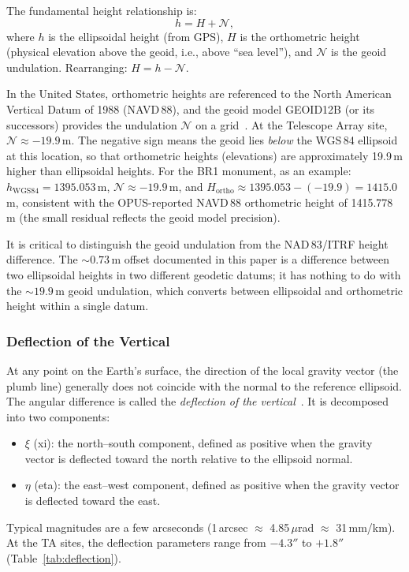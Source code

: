 The fundamental height relationship is:
\begin{equation}
h = H + \mathcal{N},
\label{eq:height_relation}
\end{equation}
where $h$ is the ellipsoidal height (from GPS), $H$ is the orthometric height (physical elevation above the geoid, i.e., above ``sea level''), and $\mathcal{N}$ is the geoid undulation. Rearranging: $H = h - \mathcal{N}$.

In the United States, orthometric heights are referenced to the North American Vertical Datum of 1988 (NAVD\,88), and the geoid model GEOID12B (or its successors) provides the undulation $\mathcal{N}$ on a grid~\cite{roman2012}. At the Telescope Array site, $\mathcal{N} \approx -19.9$\,m. The negative sign means the geoid lies \emph{below} the WGS\,84 ellipsoid at this location, so that orthometric heights (elevations) are approximately 19.9\,m higher than ellipsoidal heights. For the BR1 monument, as an example: $h_{\text{WGS84}} = 1395.053$\,m, $\mathcal{N} \approx -19.9$\,m, and $H_{\text{ortho}} \approx 1395.053 - (-19.9) = 1415.0$\,m, consistent with the OPUS-reported NAVD\,88 orthometric height of 1415.778\,m (the small residual reflects the geoid model precision).

It is critical to distinguish the geoid undulation from the NAD\,83/ITRF height difference. The $\sim\!0.73$\,m offset documented in this paper is a difference between two ellipsoidal heights in two different geodetic datums; it has nothing to do with the $\sim\!19.9$\,m geoid undulation, which converts between ellipsoidal and orthometric height within a single datum.

\subsubsection{Deflection of the Vertical}
\label{sec:deflection}

At any point on the Earth's surface, the direction of the local gravity vector (the plumb line) generally does not coincide with the normal to the reference ellipsoid. The angular difference is called the \emph{deflection of the vertical}~\cite{torge2012}. It is decomposed into two components:
\begin{itemize}[nosep]
\item $\xi$ (xi): the north--south component, defined as positive when the gravity vector is deflected toward the north relative to the ellipsoid normal.
\item $\eta$ (eta): the east--west component, defined as positive when the gravity vector is deflected toward the east.
\end{itemize}
Typical magnitudes are a few arcseconds (1\,arcsec $\approx$ 4.85\,$\mu$rad $\approx$ 31\,mm/km). At the TA sites, the deflection parameters range from $-4.3''$ to $+1.8''$ (Table~\ref{tab:deflection}).

